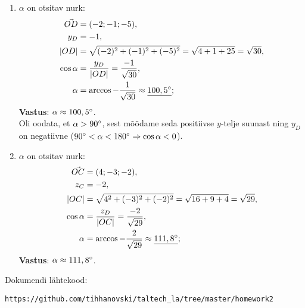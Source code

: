 \documentclass[10pt, a4paper]{article}
\begin{document}
\begin{enumerate}
\item
    $\alpha$ on otsitav nurk:
    \begin{align}
        \nonumber
        \vec{OD} &= (-2; -1; -5), \\
        \nonumber
        y_D &= -1, \\
        \nonumber
        \lvert OD \lvert &= \sqrt{(-2)^2 + (-1)^2 + (-5)^2} = \sqrt{4 + 1 + 25} = \sqrt{30}, \\
        \nonumber
        \cos \alpha &= \frac{y_D}{\lvert OD \lvert} = \frac{-1}{\sqrt{30}},\\
        \nonumber
        \alpha &= \arccos -\frac{1}{\sqrt{30}} \approx \underline{100,5\degree};
    \end{align}
    \textbf{Vastus}: $\alpha \approx 100,5\degree$.\\
    Oli oodata, et $\alpha > 90\degree$, sest mõõdame seda positiivse $y$-telje suunast ning $y_D$ on negatiivne ($90\degree < \alpha < 180\degree \Rightarrow \cos \alpha < 0 $).

\item
$\alpha$ on otsitav nurk:
\begin{align}
    \nonumber
    \vec{OC} &= (4; -3; -2), \\
    \nonumber
    z_C &= -2, \\
    \nonumber
    \lvert OC \lvert &= \sqrt{4^2 + (-3)^2 + (-2)^2} = \sqrt{16 + 9 + 4} = \sqrt{29}, \\
    \nonumber
    \cos \alpha &= \frac{z_D}{\lvert OC \lvert} = \frac{-2}{\sqrt{29}},\\
    \nonumber
    \alpha &= \arccos -\frac{2}{\sqrt{29}} \approx \underline{111,8\degree};
\end{align}
\textbf{Vastus}: $\alpha \approx 111,8\degree$.\\

\end{enumerate}

Dokumendi lähtekood: 
\begin{verbatim}
https://github.com/tihhanovski/taltech_la/tree/master/homework2
\end{verbatim}
\end{document}
